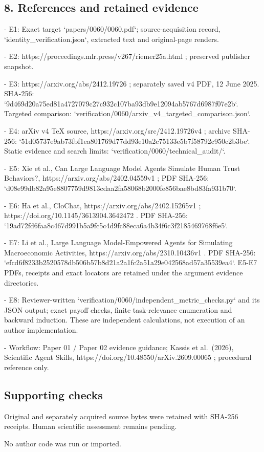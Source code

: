 \documentclass[10pt]{article}
\begin{document}
\subsection*{8. References and retained evidence}
- E1: Exact target `papers/0060/0060.pdf`; source-acquisition record, `identity\_verification.json`, extracted text and original-page renders.\par
- E2: https://proceedings.mlr.press/v267/riemer25a.html ; preserved publisher snapshot.\par
- E3: https://arxiv.org/abs/2412.19726 ; separately saved v4 PDF, 12 June 2025. SHA-256: `9d469d20a75ed81a4727079c27c932c107ba93db9e12094ab5767d6987f07e2b`. Targeted comparison: `verification/0060/arxiv\_v4\_targeted\_comparison.json`.\par
- E4: arXiv v4 TeX source, https://arxiv.org/src/2412.19726v4 ; archive SHA-256: `51d05737e9ab73fbf1ea801769d77dd93e10a2c75133e5b7f58792c950c2b3be`. Static evidence and search limits: `verification/0060/technical\_audit/`.\par
- E5: Xie et al., Can Large Language Model Agents Simulate Human Trust Behaviors?, https://arxiv.org/abs/2402.04559v1 ; PDF SHA-256: `d08e99db82a95e8807759d9813cdaa2fa58068b2000fe856bae8bd83fa931b70`.\par
- E6: Ha et al., CloChat, https://arxiv.org/abs/2402.15265v1 ; https://doi.org/10.1145/3613904.3642472 . PDF SHA-256: `19ad72fd6faa8c467d991b5a9fc5c4d9fc88eca6a4b34f6c3f2185469768f6e5`.\par
- E7: Li et al., Large Language Model-Empowered Agents for Simulating Macroeconomic Activities, https://arxiv.org/abs/2310.10436v1 . PDF SHA-256: `efcd6f8233b2520578db506b57b8d21a2a1fc2a51a29e042568ad57a35539ea4`. E5-E7 PDFs, receipts and exact locators are retained under the argument evidence directories.\par
- E8: Reviewer-written `verification/0060/independent\_metric\_checks.py` and its JSON output; exact payoff checks, finite task-relevance enumeration and backward induction. These are independent calculations, not execution of an author implementation.\par
- Workflow: Paper 01 / Paper 02 evidence guidance; Kassis et al. (2026), Scientific Agent Skills, https://doi.org/10.48550/arXiv.2609.00065 ; procedural reference only.\par
\subsection*{Supporting checks}
Original and separately acquired source bytes were retained with SHA-256 receipts. Human scientific assessment remains pending.\par
No author code was run or imported.\par
\end{document}
